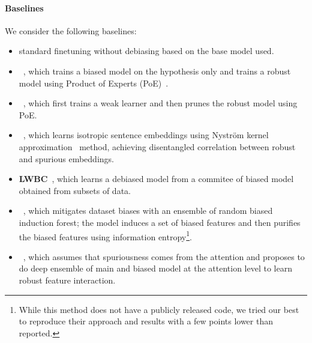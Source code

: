 \paragraph{Baselines} 
We consider the following baselines:
\vspace{-5pt}
\begin{itemize}
    \itemsep-2pt
    \itemindent-10pt
    \item \textbf{\FT} standard finetuning without debiasing based on the base model used. 
    \item \textbf{\ETE}~\citep{karimi-mahabadi-etal-2020-end}, which trains a biased model on the hypothesis only and trains a robust model using Product of Experts (PoE)~\citep{10.1162/089976602760128018}.
    \item \textbf{\MASK}~\citep{meissner-etal-2022-debiasing}, which first trains a weak learner and then prunes the robust model using PoE. %
    \item \textbf{\KW}~\citep{gao-etal-2022-kernel}, which learns isotropic sentence embeddings using Nystr\"{o}m kernel approximation~\citep{Xu_Jin_Shen_Zhu_2015} method, achieving disentangled correlation between robust and spurious embeddings.
    \item \textbf{LWBC}~\citep{kim2022learning}, which learns a debiased model from a commitee of biased model obtained from subsets of data.
    \item \textbf{\IE}~\citep{du-etal-2023-towards}, which mitigates dataset biases with an ensemble of random biased induction forest; the model induces a set of biased features and then purifies the biased features using information entropy\footnote{While this method does not have a publicly released code, we tried our best to reproduce their approach and results with a few points lower than reported.}.
    \item \textbf{\READ}~\citep{wang-etal-2023-robust}, which assumes that spuriousness comes from the attention
    and proposes to do deep ensemble of main and biased model at the attention level to learn robust feature interaction.
\end{itemize}



